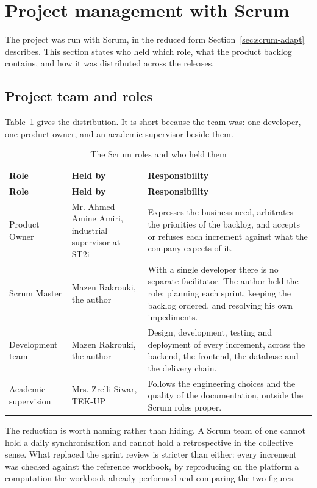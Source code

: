 \section{Project management with Scrum}
The project was run with Scrum, in the reduced form Section~\ref{sec:scrum-adapt} describes. This
section states who held which role, what the product backlog contains, and how it was distributed
across the releases.

\subsection{Project team and roles}
Table~\ref{tab:scrum-roles} gives the distribution. It is short because the team was: one
developer, one product owner, and an academic supervisor beside them.

\begin{longtable}{|m{3.1cm}|m{4.4cm}|m{6.7cm}|}
\caption{The Scrum roles and who held them}\label{tab:scrum-roles}\\
\hline
\textbf{Role} & \textbf{Held by} & \textbf{Responsibility} \\
\hline
\endfirsthead
\hline
\textbf{Role} & \textbf{Held by} & \textbf{Responsibility} \\
\hline
\endhead
\endfoot
\endlastfoot
\hline
Product Owner & Mr. Ahmed Amine Amiri, industrial supervisor at ST2i & Expresses the business need, arbitrates the priorities of the backlog, and accepts or refuses each increment against what the company expects of it. \\
\hline
Scrum Master & Mazen Rakrouki, the author & With a single developer there is no separate facilitator. The author held the role: planning each sprint, keeping the backlog ordered, and resolving his own impediments. \\
\hline
Development team & Mazen Rakrouki, the author & Design, development, testing and deployment of every increment, across the backend, the frontend, the database and the delivery chain. \\
\hline
Academic supervision & Mrs. Zrelli Siwar, TEK-UP & Follows the engineering choices and the quality of the documentation, outside the Scrum roles proper. \\
\hline
\end{longtable}

The reduction is worth naming rather than hiding. A Scrum team of one cannot hold a daily
synchronisation and cannot hold a retrospective in the collective sense. What replaced the sprint
review is stricter than either: every increment was checked against the reference workbook, by
reproducing on the platform a computation the workbook already performed and comparing the two
figures.

